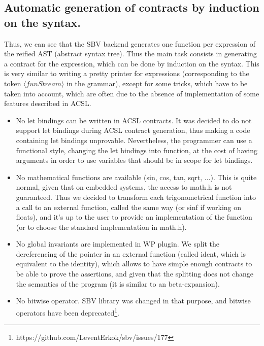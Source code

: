 \documentclass[a4paper,11pt,final]{article}
\begin{document}
  
  \subsection{Automatic generation of contracts by induction on the syntax.}
  
  Thus, we can see that the SBV backend generates one function per expression of the reified AST (abstract syntax tree). Thus the main task consists in generating a contract for the expression, which can be done by induction on the syntax. This is very similar to writing a pretty printer for expressions (corresponding to the token $\langle funStream \rangle$ in the grammar), except for some tricks, which have to be taken into account, which are often due to the absence of implementation of some features described in ACSL.
  
  \begin{itemize}
  	\item No let bindings can be written in ACSL contracts.
  	\subitem It was decided to do not support let bindings during ACSL contract generation, thus making a code containing let bindings unprovable. Nevertheless, the programmer can use a functional style, changing the let bindings into function, at the cost of having arguments in order to use variables that should be in scope for let bindings.
  	\item No mathematical functions are available (sin, cos, tan, sqrt, ...).
  	\subitem This is quite normal, given that on embedded systems, the access to math.h is not guaranteed. Thus we decided to transform each trigonometrical function into a call to an external function, called the same way (or sinf if working on floats), and it's up to the user to provide an implementation of the function (or to choose the standard implementation in math.h).
  	\item No global invariants are implemented in WP plugin.
  	\subitem We split the dereferencing of the pointer in an external function (called ident, which is equivalent to the identity), which allows to have simple enough contracts to be able to prove the assertions, and given that the splitting does not change the semantics of the program (it is similar to an beta-expansion).
  	\item No bitwise operator.
  	\subitem SBV library was changed in that purpose, and bitwise operators have been deprecated\footnote{https://github.com/LeventErkok/sbv/issues/177}.
  \end{itemize}
  
\end{document}
